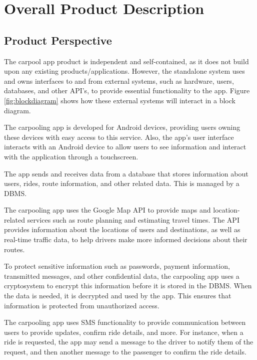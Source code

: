 \documentclass[]{article}
\begin{document}

\section{Overall Product Description}
\label{sec:overall_description}

\subsection{Product Perspective}
\label{sub:product_perspective}
The carpool app product is independent and self-contained, as it does not build upon any existing products/applications. However, the standalone system uses and owns interfaces to and from external systems, such as hardware, users, databases, and other API's, to provide essential functionality to the app. Figure \ref{fig:blockdiagram} shows how these external systems will interact in a block diagram.

The carpooling app is developed for Android devices, providing users owning these devices with easy access to this service. Also, the app's user interface interacts with an Android device to allow users to see information and interact with the application through a touchscreen.

The app sends and receives data from a database that stores information about users, rides, route information, and other related data. This is managed by a DBMS.

The carpooling app uses the Google Map API to provide maps and location-related services such as route planning and estimating travel times. The API provides information about the locations of users and destinations, as well as real-time traffic data, to help drivers make more informed decisions about their routes.

To protect sensitive information such as passwords, payment information, transmitted messages, and other confidential data, the carpooling app uses a cryptosystem to encrypt this information before it is stored in the DBMS. When the data is needed, it is decrypted and used by the app. This ensures that information is protected from unauthorized access.

The carpooling app uses SMS functionality to provide communication between users to provide updates, confirm ride details, and more. For instance, when a ride is requested, the app may send a message to the driver to notify them of the request, and then another message to the passenger to confirm the ride details.
\end{document}

